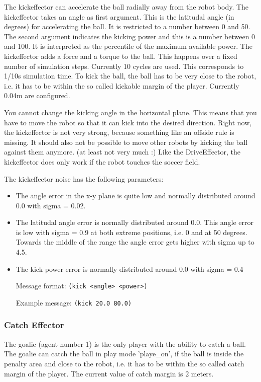 The kickeffector can accelerate the ball radially away from the robot
body. The kickeffector takes an angle as first argument. This is the
latitudal angle (in degrees) for accelerating the ball. It is
restricted to a number between 0 and 50. The second argument indicates
the kicking power and this is a number between 0 and 100. It is
interpreted as the percentile of the maximum available power. The
kickeffector adds a force and a torque to the ball. This happens over
a fixed number of simulation steps. Currently 10 cycles are used. This
corresponds to 1/10s simulation time. To kick the ball, the ball has
to be very close to the robot, i.e. it has to be within the so called
kickable margin of the player. Currently 0.04m are configured.

You cannot change the kicking angle in the horizontal plane. This
means that you have to move the robot so that it can kick into the
desired direction. Right now, the kickeffector is not very strong,
because something like an offside rule is missing. It should also not
be possible to move other robots by kicking the ball against them
anymore. (at least not very much :) Like the DriveEffector, the
kickeffector does only work if the robot touches the soccer field.

The kickeffector noise has the following parameters: 
\begin{itemize}
\item The angle error in the x-y plane is quite low and normally distributed
around 0.0 with sigma = 0.02.
\item The latitudal angle error is normally distributed around 0.0. This
angle error is low with sigma = 0.9 at both extreme positions, i.e. 0
and at 50 degrees. Towards the middle of the range the angle error
gets higher with sigma up to 4.5.
\item The kick power error is normally distributed around 0.0 with sigma =
0.4
\end{itemize}

\begin{itemize}
	\item[Message format:] \texttt{(kick <angle> <power>)}
	\item[Example message:] \texttt{(kick 20.0 80.0)}
\end{itemize}

\subsubsection{Catch Effector}
The goalie (agent number 1) is the only player with the ability to
catch a ball. The goalie can catch the ball in play mode 'playe\_on',
if the ball is inside the penalty area and close to the robot, i.e. it
has to be within the so called catch margin of the player. The current
value of catch margin is 2 meters.

